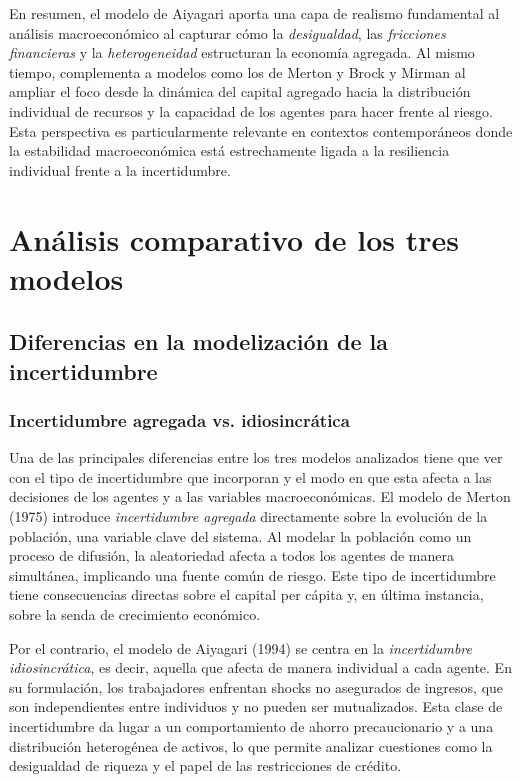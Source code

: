 \documentclass[a4paper,12pt]{article}
\begin{document}
En resumen, el modelo de Aiyagari aporta una capa de realismo fundamental al análisis macroeconómico al capturar cómo la \textit{desigualdad}, las \textit{fricciones financieras} y la \textit{heterogeneidad} estructuran la economía agregada. Al mismo tiempo, complementa a modelos como los de Merton y Brock y Mirman al ampliar el foco desde la dinámica del capital agregado hacia la distribución individual de recursos y la capacidad de los agentes para hacer frente al riesgo. Esta perspectiva es particularmente relevante en contextos contemporáneos donde la estabilidad macroeconómica está estrechamente ligada a la resiliencia individual frente a la incertidumbre.









\section{Análisis comparativo de los tres modelos}

\subsection{Diferencias en la modelización de la incertidumbre}

\subsubsection{Incertidumbre agregada vs. idiosincrática}

Una de las principales diferencias entre los tres modelos analizados tiene que ver con el tipo de incertidumbre que incorporan y el modo en que esta afecta a las decisiones de los agentes y a las variables macroeconómicas. El modelo de Merton (1975) introduce \textit{incertidumbre agregada} directamente sobre la evolución de la población, una variable clave del sistema. Al modelar la población como un proceso de difusión, la aleatoriedad afecta a todos los agentes de manera simultánea, implicando una fuente común de riesgo. Este tipo de incertidumbre tiene consecuencias directas sobre el capital per cápita y, en última instancia, sobre la senda de crecimiento económico.

Por el contrario, el modelo de Aiyagari (1994) se centra en la \textit{incertidumbre idiosincrática}, es decir, aquella que afecta de manera individual a cada agente. En su formulación, los trabajadores enfrentan shocks no asegurados de ingresos, que son independientes entre individuos y no pueden ser mutualizados. Esta clase de incertidumbre da lugar a un comportamiento de ahorro precaucionario y a una distribución heterogénea de activos, lo que permite analizar cuestiones como la desigualdad de riqueza y el papel de las restricciones de crédito.
\end{document}
